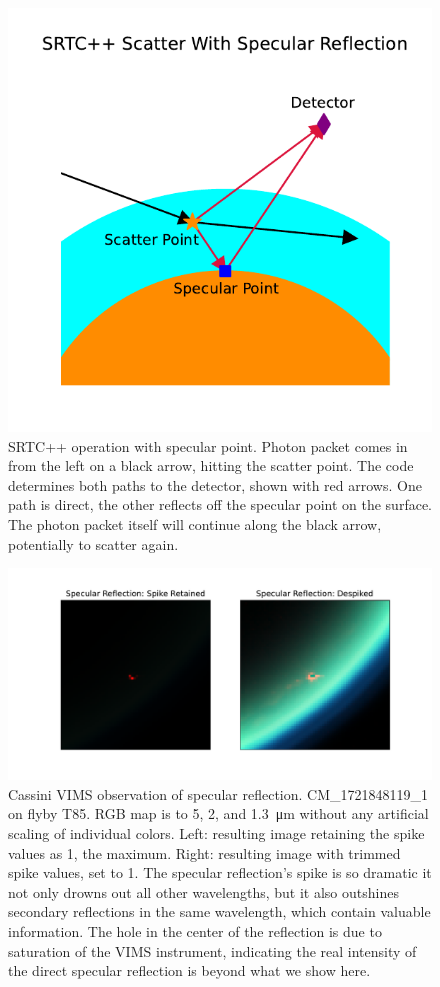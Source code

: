 \documentclass[linenumbers]{aastex631}
\begin{document}
\begin{figure}[htbp]
\includegraphics[scale = 0.55]{SRTCSpec.pdf}
\centering
\caption{SRTC++ operation with specular point. Photon packet comes in from the left on a black arrow, hitting the scatter point. The code determines both paths to the detector, shown with red arrows. One path is direct, the other reflects off the specular point on the surface. The photon packet itself will continue along the black arrow, potentially to scatter again.}
\label{fig:2}
\end{figure}

\begin{figure}[htbp]
\includegraphics[scale = 0.5]{SpecSpikeNoSpike.pdf}
\centering
\caption{Cassini VIMS observation of specular reflection. CM\_1721848119\_1 on flyby T85. RGB map is to 5, 2, and \qty{1.3}{\micro\meter} without any artificial scaling of individual colors. Left: resulting image retaining the spike values as 1, the maximum. Right: resulting image with trimmed spike values, set to 1. The specular reflection's spike is so dramatic it not only drowns out all other wavelengths, but it also outshines secondary reflections in the same wavelength, which contain valuable information. The hole in the center of the reflection is due to saturation of the VIMS instrument, indicating the real intensity of the direct specular reflection is beyond what we show here.}
\label{fig:3}
\end{figure}
\end{document}
